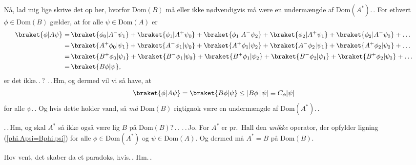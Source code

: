 \documentclass{report}
\begin{document}
Nå, lad mig lige skrive det op her, hvorfor Dom$(B)$ må eller ikke nødvendigvis må være en undermængde af Dom$(A^*)$.\,. For ethvert $\phi\in\mathrm{Dom}(B)$ gælder, at for alle $\psi\in \mathrm{Dom}(A)$ er
\begin{align}
\begin{aligned}
	\braket{\phi| A \psi} =&\,
		\braket{\phi_0| A^- \psi_1} + \braket{\phi_1| A^+ \psi_0} + \braket{\phi_1| A^- \psi_2} + \braket{\phi_2| A^+ \psi_1} + \braket{\phi_2| A^- \psi_3} + \ldots \\
		=&\,
		\braket{A^+ \phi_0| \psi_1} + \braket{A^- \phi_1| \psi_0} + \braket{A^+ \phi_1| \psi_2} + \braket{A^- \phi_2| \psi_1} + \braket{A^+ \phi_2| \psi_3} + \ldots \\
		=&\,
		\braket{B^+ \phi_0| \psi_1} + \braket{B^- \phi_1| \psi_0} + \braket{B^+ \phi_1| \psi_2} + \braket{B^- \phi_2| \psi_1} + \braket{B^+ \phi_2| \psi_3} + \ldots \\
		=&\,
		\braket{B \phi| \psi},
	\label{phi.Apsi=Bphi.psi}
\end{aligned}
\end{align}
er det ikke.\,.\,? .\,.\,Hm, og dermed vil vi så have, at
\begin{align}
\begin{aligned}
	\braket{\phi| A \psi} =
	\braket{B \phi| \psi} \leq |B \phi| |\psi| \equiv C_{\phi} |\psi|
\end{aligned}
\end{align}
for alle $\psi$.\,. Og hvis dette holder vand, så \emph{må} Dom$(B)$ rigtignok være en undermængde af Dom$(A^*)$.\,. 

.\,.\,Hm, og skal $A^*$ så ikke også være lig $B$ på Dom$(B)$?\,.\,. .\,.\,Jo. For $A^*$ er pr.\ Hall den \emph{unikke} operator, der opfylder ligning (\ref{phi.Apsi=Bphi.psi}) for alle $\phi \in \mathrm{Dom}(A^*)$ og $\psi \in \mathrm{Dom}(A)$. Og dermed må $A^* = B$ på Dom$(B)$. 

Hov vent, det skaber da et paradoks, hvis.\,. Hm.\,. 
\end{document}
